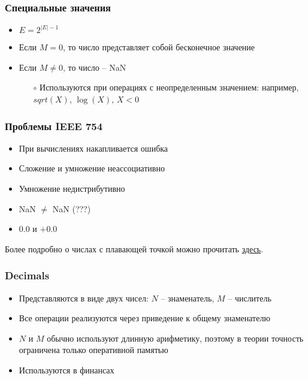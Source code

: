   \subsubsection*{Специальные значения}
    \begin{itemize}
      \item $E = 2^{|E| - 1}$
      \item Если $M = 0$, то число представляет собой бесконечное значение
      \item Если $M \neq 0$, то число -- NaN
      \begin{itemize}
        \item[$\circ$] Используются при операциях с неопределенным значением: например, $sqrt(X)$, $\log(X)$, $X < 0$
      \end{itemize}
    \end{itemize}
    
  \subsubsection*{Проблемы IEEE 754}
    \begin{itemize}
      \item При вычислениях накапливается ошибка
      \item Сложение и умножение неассоциативно
      \item Умножение недистрибутивно
      \item NaN $\neq$ NaN (???)
      \item $0.0$ и $+0.0$
    \end{itemize}
  
  Более подробно о числах с плавающей точкой можно прочитать \href{http://steve.hollasch.net/cgindex/coding/ieeefloat.html}{здесь}.
  
  \subsubsection{Decimals}
    \begin{itemize}
      \item Представляются в виде двух чисел: $N$ -- знаменатель, $M$ -- числитель
      \item Все операции реализуются через приведение к общему знаменателю
      \item $N$ и $M$ обычно используют длинную арифметику, поэтому в теории точность ограничена только оперативной памятью
      \item Используются в финансах
    \end{itemize}
  
